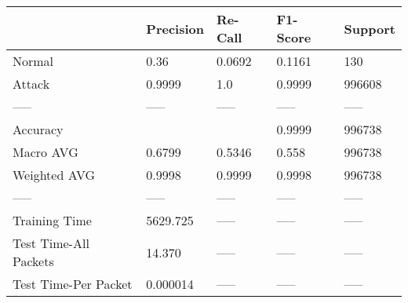 \begin{tabular}{lllll}
\toprule
{} & Precision & Re-Call & F1-Score & Support \\
\midrule
Normal                &      0.36 &  0.0692 &   0.1161 &     130 \\
Attack                &    0.9999 &     1.0 &   0.9999 &  996608 \\
-----                 &     ----- &   ----- &    ----- &   ----- \\
Accuracy              &           &         &   0.9999 &  996738 \\
Macro AVG             &    0.6799 &  0.5346 &    0.558 &  996738 \\
Weighted AVG          &    0.9998 &  0.9999 &   0.9998 &  996738 \\
-----                 &     ----- &   ----- &    ----- &   ----- \\
Training Time         &  5629.725 &   ----- &    ----- &   ----- \\
Test Time-All Packets &    14.370 &   ----- &    ----- &   ----- \\
Test Time-Per Packet  &  0.000014 &   ----- &    ----- &   ----- \\
\bottomrule
\end{tabular}
